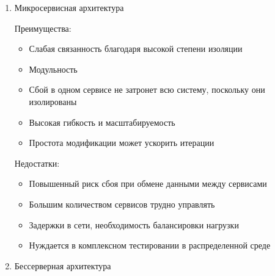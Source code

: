 \documentclass[utf8, russian]{eskdtext}
\begin{document}
\begin{enumerate}
 Преимущества:
 \begin{itemize}
     \item Слабая связанность
     \item Гибкость
     \item Возможность повторного использования
 \end{itemize}
 
 Недостатки:
 \begin{itemize}
     \item Сложность
     \item Сетевая зависимость
 \end{itemize}
 
 \item{ Микросервисная архитектура}
 
 Преимущества:
 \begin{itemize}
     \item Слабая связанность благодаря высокой степени изоляции
     \item Модульность
     \item Сбой в одном сервисе не затронет всю систему, поскольку они изолированы
     \item Высокая гибкость и масштабируемость
     \item Простота модификации может ускорить итерации
 \end{itemize}
 
 Недостатки:
 \begin{itemize}
     \item Повышенный риск сбоя при обмене данными между сервисами
     \item Большим количеством сервисов трудно управлять
     \item Задержки в сети, необходимость балансировки нагрузки
     \item Нуждается в комплексном тестировании в распределенной среде
 \end{itemize}
 
 \item{ Бессерверная архитектура}
 

\end{enumerate}
\end{document}
